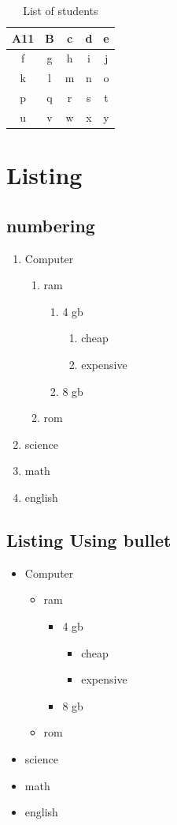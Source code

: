 \documentclass[12pt]{report}
\begin{document}
\begin{table}[!hbt] %
\centering
\caption{List of students}
\begin{tabular}{||c|c|c|c|c||}
\hline 
A11 & B & c & d & e \\ 
\hline 
f & g & h & i & j \\ 
\hline 
k & l & m & n & o \\ 
\hline 
p & q & r & s & t \\ 
\hline 
u & v & w & x & y \\ 
\hline 
\end{tabular} 
\end{table}
\chapter{Listing}
\section{numbering}
\begin{enumerate}
\item Computer
   \begin{enumerate}
   \item ram
    \begin{enumerate}
    \item 4 gb
       \begin{enumerate}
       \item cheap
       \item expensive
       \end{enumerate}
    \item 8 gb
   \end{enumerate}
   \item rom
   \end{enumerate}
\item science
\item math
\item english
\end{enumerate}

\section{Listing Using bullet}
\begin{itemize}
\item Computer
   \begin{itemize}
   \item ram %
    \begin{itemize}
    \item 4 gb
       \begin{itemize}
       \item cheap
       \item expensive
       \end{itemize}
    \item 8 gb
   \end{itemize}
   \item rom
   \end{itemize}
\item science
\item math
\item english
\end{itemize}
\end{document}
